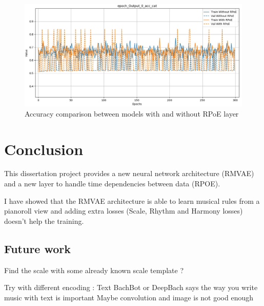 \documentclass[12pt]{report}
\begin{document}
\begin{figure}[ht]
    \centering
    \includegraphics[width=\textwidth]{images/experiences/rpoe/acc-comparison-rpoe.jpg}
    \caption{Accuracy comparison between models with and without RPoE layer}
    \label{fig:acc-comparison-rpoe}
\end{figure}


\chapter{Conclusion}

This dissertation project provides a new neural network architecture (RMVAE) and a new layer to handle time dependencies between data (RPOE).

I have showed that the RMVAE architecture is able to learn musical rules from a pianoroll view and adding extra losses (Scale, Rhythm and Harmony losses) doesn't help the training.


\section*{Future work}
Find the scale with some already known scale template ?

Try with different encoding : Text
BachBot or DeepBach says the way you write music with text is important 
Maybe convolution and image is not good enough
\end{document}
